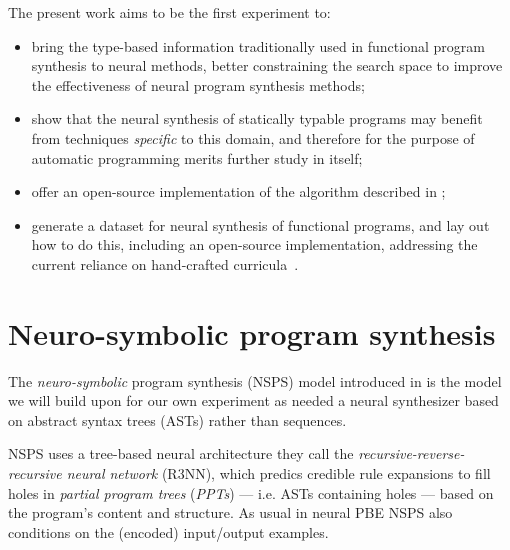 \documentclass{article} %
\begin{document}
The present work aims to be the first experiment to:
\begin{itemize}
    \item bring the type-based information traditionally used in functional program synthesis to neural methods,
    better constraining the search space to improve the effectiveness of neural program synthesis methods;
    \item show that the neural synthesis of statically typable programs may benefit from techniques \emph{specific} to this domain, and therefore for the purpose of automatic programming merits further study in itself;
    \item offer an open-source implementation of the algorithm described in \citet{nsps};
    \item generate a dataset for neural synthesis of functional programs, and lay out how to do this, including an open-source implementation, addressing the current reliance on hand-crafted curricula~\citep{nps}.
\end{itemize}

\section{Neuro-symbolic program synthesis} \label{sec:nsps}

The \emph{neuro-symbolic} program synthesis (NSPS) model introduced in \citet{nsps}
is the model we will build upon for our own experiment as needed a neural synthesizer
based on abstract syntax trees (ASTs) rather than sequences.

NSPS uses a tree-based neural architecture they call the
\emph{recursive-reverse-recursive neural network} (R3NN),
which predics credible rule expansions to fill holes
in \emph{partial program trees} (\emph{PPTs}) --- i.e. ASTs containing holes --- based on the program's content and structure.
As usual in neural PBE NSPS also conditions on the (encoded) input/output examples.
\end{document}
